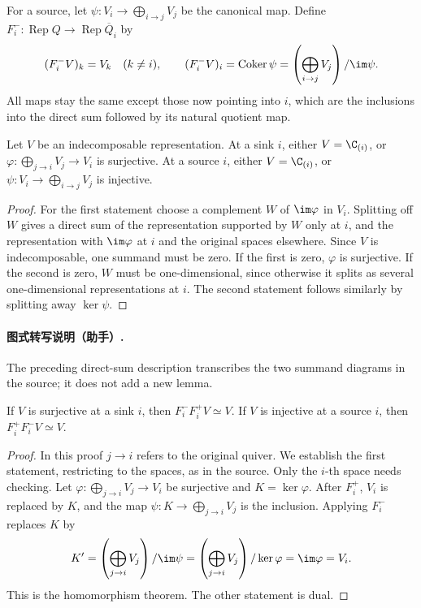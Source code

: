 For a source, let $\psi:V_i\to\bigoplus_{i\to j}V_j$ be the canonical map. Define $F_i^-:\operatorname{Rep}Q\to\operatorname{Rep}\overline Q_i$ by
\[
(F_i^-V)_k=V_k\quad(k\ne i),\qquad
(F_i^-V)_i=\operatorname{Coker}\psi=\left(\bigoplus_{i\to j}V_j\right)/\im\psi.
\]
All maps stay the same except those now pointing into $i$, which are the inclusions into the direct sum followed by its natural quotient map.

\begin{proposition}[Proposition 5.28]
Let $V$ be an indecomposable representation. At a sink $i$, either $V=\C_{(i)}$, or $\varphi:\bigoplus_{j\to i}V_j\to V_i$ is surjective. At a source $i$, either $V=\C_{(i)}$, or $\psi:V_i\to\bigoplus_{i\to j}V_j$ is injective.
\end{proposition}
\begin{proof}
For the first statement choose a complement $W$ of $\im\varphi$ in $V_i$. Splitting off $W$ gives a direct sum of the representation supported by $W$ only at $i$, and the representation with $\im\varphi$ at $i$ and the original spaces elsewhere. Since $V$ is indecomposable, one summand must be zero. If the first is zero, $\varphi$ is surjective. If the second is zero, $W$ must be one-dimensional, since otherwise it splits as several one-dimensional representations at $i$. The second statement follows similarly by splitting away $\ker\psi$.
\end{proof}
\paragraph{图式转写说明（助手）.} The preceding direct-sum description transcribes the two summand diagrams in the source; it does not add a new lemma.

\begin{proposition}[Proposition 5.29]
If $V$ is surjective at a sink $i$, then $F_i^-F_i^+V\simeq V$. If $V$ is injective at a source $i$, then $F_i^+F_i^-V\simeq V$.
\end{proposition}
\begin{proof}
In this proof $j\to i$ refers to the original quiver. We establish the first statement, restricting to the spaces, as in the source. Only the $i$-th space needs checking. Let $\varphi:\bigoplus_{j\to i}V_j\to V_i$ be surjective and $K=\ker\varphi$. After $F_i^+$, $V_i$ is replaced by $K$, and the map $\psi:K\to\bigoplus_{j\to i}V_j$ is the inclusion. Applying $F_i^-$ replaces $K$ by
\[
K'=\left(\bigoplus_{j\to i}V_j\right)/\im\psi
=\left(\bigoplus_{j\to i}V_j\right)/\ker\varphi
=\im\varphi=V_i.
\]
This is the homomorphism theorem. The other statement is dual.
\end{proof}

